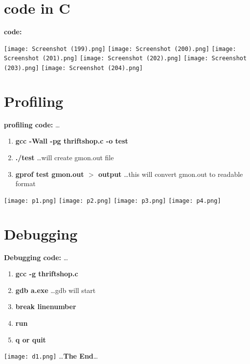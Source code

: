 \documentclass[12pt]{article}
\begin{document}
\section{code in C}
\textbf{code:} \vspace{1cm}

\newpage

\texttt{[image: Screenshot (199).png]} \vspace{2cm}
\texttt{[image: Screenshot (200).png]} \vspace{2cm}
\texttt{[image: Screenshot (201).png]} \vspace{2cm}
\texttt{[image: Screenshot (202).png]} \vspace{2cm}
\texttt{[image: Screenshot (203).png]} \vspace{2cm}
\texttt{[image: Screenshot (204).png]} \vspace{2cm}
\section{Profiling}
\textbf{profiling code:} \vspace{1cm} \dots
\begin{enumerate}
\item \textbf{gcc -Wall -pg thriftshop.c -o test}
\item \textbf{./test} \dots will create gmon.out file
\item \textbf{gprof test gmon.out $>$ output} \dots this will convert gmon.out to readable format
\end{enumerate}
\vspace{1cm}
\texttt{[image: p1.png]} \vspace{1cm}
\texttt{[image: p2.png]} \vspace{1cm}
\texttt{[image: p3.png]} \vspace{1cm}
\texttt{[image: p4.png]} \vspace{1cm}

\section{Debugging}
\textbf{Debugging code:} \vspace{1cm} \dots
\begin{enumerate}
\item \textbf{gcc -g thriftshop.c }
\item \textbf{gdb a.exe} \dots gdb will start 
\item \textbf{break linenumber } 
\item \textbf{run}
\item \textbf{q or quit}
\end{enumerate}
\vspace{2cm}
\texttt{[image: d1.png]} \vspace{1cm}
\vspace{5cm}
\centering
\dots \textbf{The End}\dots
\end{document}
